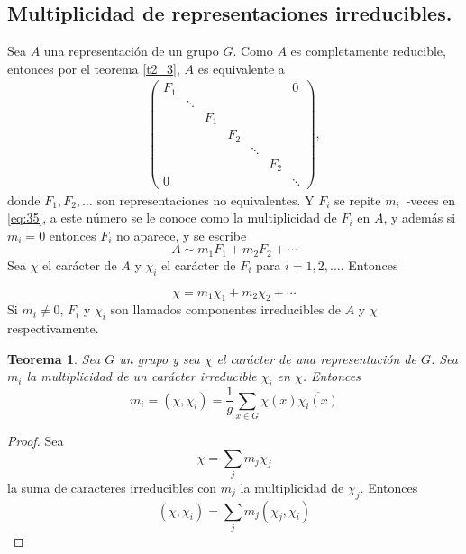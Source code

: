 \documentclass[12pt]{book}
\newtheorem{theorem}{Teorema}[section]
\theoremstyle{definition}
\newcounter{in}
\begin{document}
\subsection{Multiplicidad de representaciones irreducibles.}
\label{subsec:mri}
 Sea $A$ una representación de un grupo $G$. Como $A$ es completamente
reducible, entonces por el teorema \ref{t2_3}, $A$ es equivalente a
\begin{equation}
  \label{eq:35}
  \begin{aligned}
    \begin{pmatrix}
      F_{1} & & & & & & 0\\ 
      & \ddots & & & & & \\
      & & F_{1} & & & & \\
      & & & F_{2} & & & \\
      & & & & \ddots & & \\
      & & & & & F_{2} & \\
      0 & & & & & & \ddots
    \end{pmatrix},
  \end{aligned}
\end{equation}
donde $F_{1}, F_{2}, \ldots$ son representaciones no equivalentes. Y
$F_{i}$ se repite $m_{i}$~-veces en \ref{eq:35}, a este número se le
conoce como la multiplicidad de $F_{i}$ en $A$, y además si $m_{i}=0$
entonces $F_{i}$ no aparece, y se escribe
\begin{equation}
  \label{eq:36}
  A \sim m_{1} F_{1}+ m_{2} F_{2}+ \cdots
\end{equation}
Sea $\chi$ el carácter de $A$ y $\chi_{i}$ el carácter de $F_{i}$
para $i = 1, 2, ...$. Entonces

\begin{equation}
  \label{eq:37}
  \chi =m_{1} \chi_{1}+ m_{2} \chi_{2}+ \cdots
\end{equation}
Si $m_{i} \neq 0$, $F_{i}$ y $\chi_{i}$ son llamados componentes
irreducibles de $A$ y $\chi$ respectivamente.

\begin{theorem}
  \label{t4_5}
  Sea $G$ un grupo y sea $\chi$ el carácter de una
  representación de $G$. Sea $m_{i}$ la multiplicidad de un carácter
  irreducible $\chi_{i}$ en $\chi$. Entonces
  \begin{equation*}
    m_{i} = (\chi,\chi_{i}) = \frac{1}{g} \sum_{x \in G} \chi(x) \overline{\chi_{i}(x)}
  \end{equation*}

\end{theorem}
\begin{proof}
  Sea $$\chi=\sum_{j} m_{j} \chi_{j}$$ la suma de caracteres
  irreducibles con $m_{j}$ la multiplicidad de $\chi_{j}$. Entonces
  \begin{equation}
    \label{eq:38}
    (\chi,\chi_{i}) = \sum_{j} m_{j} (\chi_{j},\chi_{i})
  \end{equation}
\end{proof}
\end{document}
